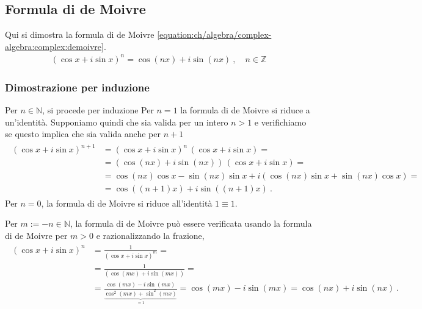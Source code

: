 \documentclass[letterpaper,10pt,italian]{jupyterBook}
\begin{document}
\subsection{Formula di de Moivre}
\label{\detokenize{ch/algebra/complex-algebra-notes:formula-di-de-moivre}}\label{\detokenize{ch/algebra/complex-algebra-notes:math-hs-algebra-complex-notes-demoivre}}
\sphinxAtStartPar
Qui si dimostra la formula di de Moivre \eqref{equation:ch/algebra/complex-algebra:complex:demoivre}.
\begin{equation*}
\begin{split}(\cos x + i \sin x)^n = \cos(nx) + i \sin(nx) \ , \quad n \in \mathbb{Z}\end{split}
\end{equation*}\subsubsection*{Dimostrazione per induzione}

\sphinxAtStartPar
Per \(n \in \mathbb{N}\), si procede per induzione   Per \(n = 1\) la formula di de Moivre si riduce a un’identità. Supponiamo quindi che sia valida per un intero \(n > 1\) e verifichiamo se questo implica che sia valida anche per \(n+1\)
\begin{equation*}
\begin{split}\begin{aligned}
  (\cos x + i \sin x)^{n+1} & = (\cos x + i \sin x)^n \, (\cos x + i \sin x) = \\
                            & = \left(\cos (nx)+ i \sin (nx) \right) \, (\cos x + i \sin x) = \\
                            & = \cos(nx) \cos x - \sin(nx) \sin x + i \left( \cos(nx) \sin x + \sin(nx) \cos x \right) = \\
                            & = \cos( (n+1)x ) + i \sin( (n+1) x ) \ .
\end{aligned}\end{split}
\end{equation*}
\sphinxAtStartPar
Per \(n = 0\), la formula di de Moivre si riduce all’identità \(1 \equiv 1\).

\sphinxAtStartPar
Per \(m := -n \in \mathbb{N}\), la formula di de Moivre può essere verificata usando la formula di de Moivre per \(m > 0\) e razionalizzando la frazione,
\begin{equation*}
\begin{split}\begin{aligned}
  \left( \cos x + i \sin x \right)^{n} & = \frac{1}{\left( \cos x + i \sin x \right)^m} = \\
   & = \frac{1}{\left( \cos (m x) + i \sin (m x) \right)} = \\
   & = \frac{\cos( m x) - i \sin (m x)}{\underbrace{\cos^2(mx) + \sin^2(mx)}_{=1}} = \cos(mx) - i \sin(mx) = \cos(nx) + i \sin(nx) \ .
\end{aligned}\end{split}
\end{equation*}
\end{document}
